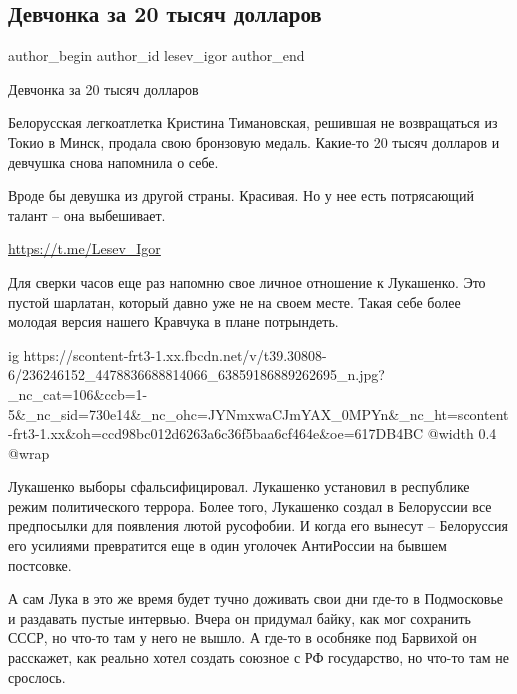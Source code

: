  
 
 
 
 
 
\subsection{Девчонка за 20 тысяч долларов}
\label{sec:10_08_2021.fb.lesev_igor.1.devchonka_by_timanovskaja}
 
\ifcmt
 author_begin
   author_id lesev_igor
 author_end
\fi

Девчонка за 20 тысяч долларов

Белорусская легкоатлетка Кристина Тимановская, решившая не возвращаться из
Токио в Минск, продала свою бронзовую медаль. Какие-то 20 тысяч долларов и
девчушка снова напомнила о себе.

Вроде бы девушка из другой страны. Красивая. Но у нее есть потрясающий талант –
она выбешивает.

\url{https://t.me/Lesev_Igor} 

Для сверки часов еще раз напомню свое личное отношение к Лукашенко. Это пустой
шарлатан, который давно уже не на своем месте. Такая себе более молодая версия
нашего Кравчука в плане потрындеть.

\ifcmt
  ig https://scontent-frt3-1.xx.fbcdn.net/v/t39.30808-6/236246152_4478836688814066_63859186889262695_n.jpg?_nc_cat=106&ccb=1-5&_nc_sid=730e14&_nc_ohc=JYNmxwaCJmYAX_0MPYn&_nc_ht=scontent-frt3-1.xx&oh=ccd98bc012d6263a6c36f5baa6cf464e&oe=617DB4BC
  @width 0.4
  @wrap 
\fi

Лукашенко выборы сфальсифицировал. Лукашенко установил в республике режим
политического террора. Более того, Лукашенко создал в Белоруссии все
предпосылки для появления лютой русофобии. И когда его вынесут – Белоруссия его
усилиями превратится еще в один уголочек АнтиРоссии на бывшем постсовке.

А сам Лука в это же время будет тучно доживать свои дни где-то в Подмосковье и
раздавать пустые интервью. Вчера он придумал байку, как мог сохранить СССР, но
что-то там у него не вышло. А где-то в особняке под Барвихой он расскажет, как
реально хотел создать союзное с РФ государство, но что-то там не срослось.

